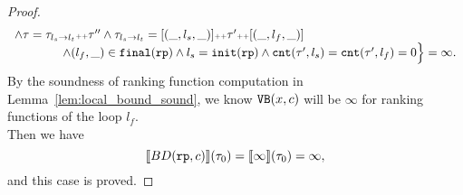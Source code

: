 \begin{proof}
\[\begin{array}{l}
    \land \mathtt{\tau} = \mathtt{\tau}_{l_s \to l_t} {\scriptscriptstyle ++} \mathtt{\tau}''
    \land \mathtt{\tau}_{l_s \to l_t} = [(\_, l_s, \_)] {\scriptscriptstyle ++} \mathtt{\tau}' {\scriptscriptstyle ++} [(\_, l_f, \_)]
    \\ \qquad \qquad
  \land (l_{f}, \_) \in \mathtt{final}(\mathtt{rp})
  \land l_s = \mathtt{init}(\mathtt{rp})
  \land \mathtt{cnt}(\mathtt{\tau}', l_s) = \mathtt{cnt}(\mathtt{\tau}', l_f) = 0 
  \Big\} = \infty.
  \end{array}
\]
By the soundness of ranking function computation in Lemma~\ref{lem:local_bound_sound}, we know ${\mathtt{VB}}(x, c)$ will be $\infty$ for ranking functions of the loop $l_f$.
\\
Then we have 
\[
  \llbracket BD(\mathtt{rp}, c) \rrbracket(\mathtt{\tau}_0) = \llbracket \infty \rrbracket(\mathtt{\tau}_0) = \infty,
\]
and this case is proved.
\end{proof}